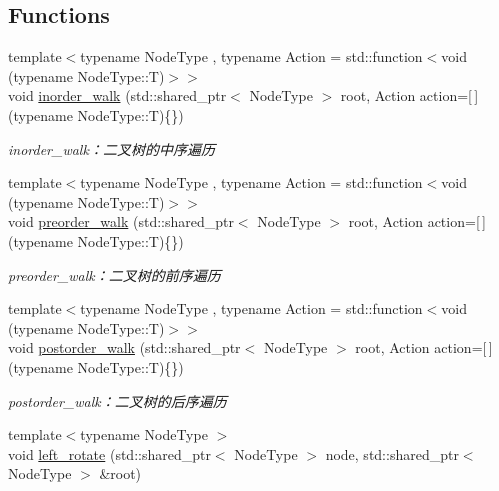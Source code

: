 \subsection*{Functions}
\begin{DoxyCompactItemize}
\item 
{\footnotesize template$<$typename Node\+Type , typename Action  = std\+::function$<$void (typename Node\+Type\+::\+T)$>$$>$ }\\void \hyperlink{namespace_introduction_to_algorithm_1_1_tree_algorithm_aff9afe8e77b1aaaa5715b270fecd73c4}{inorder\+\_\+walk} (std\+::shared\+\_\+ptr$<$ Node\+Type $>$ root, Action action=\mbox{[}$\,$\mbox{]}(typename Node\+Type\+::\+T)\{\})
\begin{DoxyCompactList}\small\item\em inorder\+\_\+walk：二叉树的中序遍历 \end{DoxyCompactList}\item 
{\footnotesize template$<$typename Node\+Type , typename Action  = std\+::function$<$void (typename Node\+Type\+::\+T)$>$$>$ }\\void \hyperlink{namespace_introduction_to_algorithm_1_1_tree_algorithm_a8b8e2e0051f5d4dc51ff841616f84e29}{preorder\+\_\+walk} (std\+::shared\+\_\+ptr$<$ Node\+Type $>$ root, Action action=\mbox{[}$\,$\mbox{]}(typename Node\+Type\+::\+T)\{\})
\begin{DoxyCompactList}\small\item\em preorder\+\_\+walk：二叉树的前序遍历 \end{DoxyCompactList}\item 
{\footnotesize template$<$typename Node\+Type , typename Action  = std\+::function$<$void (typename Node\+Type\+::\+T)$>$$>$ }\\void \hyperlink{namespace_introduction_to_algorithm_1_1_tree_algorithm_ac7566f0820ffb23ae663f8d783a86da3}{postorder\+\_\+walk} (std\+::shared\+\_\+ptr$<$ Node\+Type $>$ root, Action action=\mbox{[}$\,$\mbox{]}(typename Node\+Type\+::\+T)\{\})
\begin{DoxyCompactList}\small\item\em postorder\+\_\+walk：二叉树的后序遍历 \end{DoxyCompactList}\item 
{\footnotesize template$<$typename Node\+Type $>$ }\\void \hyperlink{namespace_introduction_to_algorithm_1_1_tree_algorithm_a96be2938a006ec461c1b0a59d6bee3b5}{left\+\_\+rotate} (std\+::shared\+\_\+ptr$<$ Node\+Type $>$ node, std\+::shared\+\_\+ptr$<$ Node\+Type $>$ \&root)

\end{DoxyCompactItemize}
